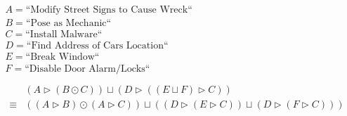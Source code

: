 \begin{center}
  \begin{math}
    \begin{array}{lll}
      A = \text{``Modify Street Signs to Cause Wreck``}\\
      B = \text{``Pose as Mechanic``}\\
      C = \text{``Install Malware``}\\
      D = \text{``Find Address of Cars Location``}\\
      E = \text{``Break Window``}\\
      F = \text{``Disable Door Alarm/Locks``}\\
      \\
      \begin{array}{lll}
               & (A \rhd (B \odot C)) \sqcup (D \rhd ((E \sqcup F) \rhd C))\\
        \equiv & ((A \rhd B) \odot (A \rhd C)) \sqcup ((D \rhd (E \rhd C)) \sqcup (D \rhd (F \rhd C)))\\
      \end{array}
      
    \end{array}
  \end{math}
\end{center}
